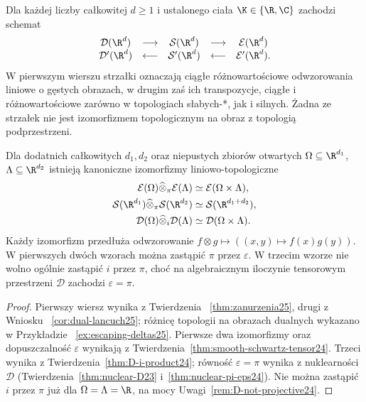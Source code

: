 \begin{stwierdzenie}
\label{prop:summary25}
Dla każdej liczby całkowitej $d\ge1$ i ustalonego
ciała $\K\in\{\R,\C\}$ zachodzi schemat
\[
 \begin{array}{ccccc}
 \mathcal D(\R^d)&\longrightarrow&\mathcal S(\R^d)
 &\longrightarrow&\mathcal E(\R^d)\\
 \mathcal D'(\R^d)&\longleftarrow&\mathcal S'(\R^d)
 &\longleftarrow&\mathcal E'(\R^d).
 \end{array}
\]
W pierwszym wierszu strzałki oznaczają ciągłe
różnowartościowe odwzorowania liniowe o gęstych obrazach,
w drugim zaś ich transpozycje, ciągłe i różnowartościowe
zarówno w topologiach słabych-*, jak i silnych.
Żadna ze strzałek nie jest izomorfizmem topologicznym
na obraz z topologią podprzestrzeni.

Dla dodatnich całkowitych $d_1,d_2$ oraz niepustych
zbiorów otwartych $\Omega\subseteq\R^{d_1}$,
$\Lambda\subseteq\R^{d_2}$ istnieją kanoniczne
izomorfizmy liniowo-topologiczne
\[
\begin{aligned}
 \mathcal E(\Omega)\widehat\otimes_\pi\mathcal E(\Lambda)
 &\simeq\mathcal E(\Omega\times\Lambda),\\
 \mathcal S(\R^{d_1})\widehat\otimes_\pi\mathcal S(\R^{d_2})
 &\simeq\mathcal S(\R^{d_1+d_2}),\\
 \mathcal D(\Omega)\widehat\otimes_i\mathcal D(\Lambda)
 &\simeq\mathcal D(\Omega\times\Lambda).
\end{aligned}
\]
Każdy izomorfizm przedłuża odwzorowanie
$f\otimes g\mapsto ((x,y)\mapsto f(x)g(y))$.
W pierwszych dwóch wzorach można zastąpić $\pi$
przez $\varepsilon$. W trzecim wzorze nie wolno
ogólnie zastąpić $i$ przez $\pi$, choć na algebraicznym
iloczynie tensorowym przestrzeni $\mathcal D$
zachodzi $\varepsilon=\pi$.
\end{stwierdzenie}
\begin{proof}
Pierwszy wiersz wynika z Twierdzenia~
\ref{thm:zanurzenia25}, drugi z Wniosku~
\ref{cor:dual-lancuch25}; różnicę topologii
na obrazach dualnych wykazano w Przykładzie~
\ref{ex:escaping-deltas25}. Pierwsze dwa izomorfizmy
oraz dopuszczalność $\varepsilon$ wynikają z
Twierdzenia~\ref{thm:smooth-schwartz-tensor24}.
Trzeci wynika z Twierdzenia~\ref{thm:D-i-product24};
równość $\varepsilon=\pi$ wynika z nuklearności
$\mathcal D$ (Twierdzenia~\ref{thm:nuclear-D23}
i~\ref{thm:nuclear-pi-eps24}). Nie można zastąpić
$i$ przez $\pi$ już dla $\Omega=\Lambda=\R$,
na mocy Uwagi~\ref{rem:D-not-projective24}.
\end{proof}

